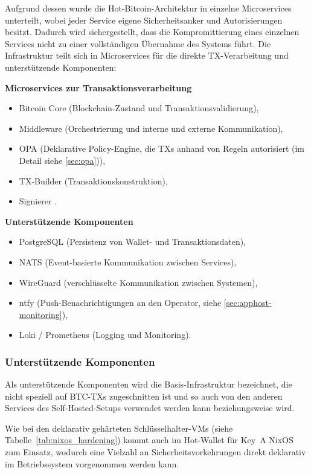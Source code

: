 Aufgrund dessen wurde die Hot-Bitcoin-Architektur in einzelne Microservices unterteilt, wobei jeder Service eigene Sicherheitsanker und Autorisierungen besitzt.
Dadurch wird sichergestellt, dass die Kompromittierung eines einzelnen Services nicht zu einer vollständigen Übernahme des Systems führt.
Die Infrastruktur teilt sich in Microservices für die direkte \ac{TX}-Verarbeitung und unterstützende Komponenten:

\textbf{Microservices zur Transaktionsverarbeitung}
\begin{itemize}
    \item Bitcoin Core (Blockchain-Zustand und Transaktionsvalidierung),
    \item Middleware (Orchestrierung und interne und externe Kommunikation),
    \item \ac{OPA} (Deklarative Policy-Engine, die \acp{TX} anhand von Regeln autorisiert (im Detail siehe \ref{sec:opa})),
    \item TX-Builder (Transaktionskonstruktion),
    \item Signierer .
\end{itemize}
\textbf{Unterstützende Komponenten}
\begin{itemize}
    \item PostgreSQL (Persistenz von Wallet- und Transaktionsdaten),
    \item \ac{NATS} (Event-basierte Kommunikation zwischen Services),
    \item WireGuard (verschlüsselte Kommunikation zwischen Systemen),
    \item ntfy (Push-Benachrichtigungen an den Operator, siehe \ref{sec:apphost-monitoring}),
    \item Loki / Prometheus (Logging und Monitoring).
\end{itemize}

\subsubsection{Unterstützende Komponenten}
Als unterstützende Komponenten wird die Basis-Infrastruktur bezeichnet, die nicht speziell auf \ac{BTC}-\acp{TX} zugeschnitten ist und so auch von den anderen Services des Self-Hosted-Setups verwendet werden kann beziehungsweise wird.

Wie bei den deklarativ gehärteten Schlüsselhalter-\acp{VM} (siehe Tabelle~\ref{tab:nixos_hardening}) kommt auch im Hot-Wallet für Key~A NixOS zum Einsatz, wodurch eine Vielzahl an Sicherheitsvorkehrungen direkt deklarativ im Betriebssystem vorgenommen werden kann.

